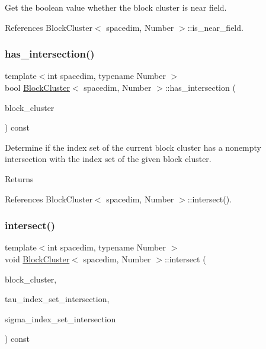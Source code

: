 Get the boolean value whether the block cluster is near field. 

References Block\+Cluster$<$ spacedim, Number $>$\+::is\+\_\+near\+\_\+field.

\mbox{\label{classBlockCluster_adf556b6483f3a81a39d3625c15e9787d}} 
\subsubsection{\texorpdfstring{has\+\_\+intersection()}{has\_intersection()}}
{\footnotesize\ttfamily template$<$int spacedim, typename Number $>$ \\
bool \hyperlink{classBlockCluster}{Block\+Cluster}$<$ spacedim, Number $>$\+::has\+\_\+intersection (\begin{DoxyParamCaption}\item[{const \hyperlink{classBlockCluster}{Block\+Cluster}$<$ spacedim, Number $>$ \&}]{block\+\_\+cluster }\end{DoxyParamCaption}) const}

Determine if the index set of the current block cluster has a nonempty intersection with the index set of the given block cluster. \begin{DoxyReturn}{Returns}

\end{DoxyReturn}


References Block\+Cluster$<$ spacedim, Number $>$\+::intersect().

\mbox{\label{classBlockCluster_a361efceed1f584db66a518007b5af633}} 
\subsubsection{\texorpdfstring{intersect()}{intersect()}}
{\footnotesize\ttfamily template$<$int spacedim, typename Number $>$ \\
void \hyperlink{classBlockCluster}{Block\+Cluster}$<$ spacedim, Number $>$\+::intersect (\begin{DoxyParamCaption}\item[{const \hyperlink{classBlockCluster}{Block\+Cluster}$<$ spacedim, Number $>$ \&}]{block\+\_\+cluster,  }\item[{std\+::vector$<$ types\+::global\+\_\+dof\+\_\+index $>$ \&}]{tau\+\_\+index\+\_\+set\+\_\+intersection,  }\item[{std\+::vector$<$ types\+::global\+\_\+dof\+\_\+index $>$ \&}]{sigma\+\_\+index\+\_\+set\+\_\+intersection }\end{DoxyParamCaption}) const}

